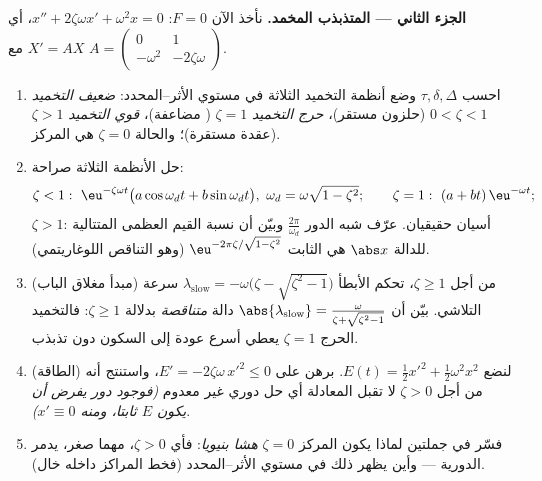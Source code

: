 \begin{problem}
\medskip
\noindent\textbf{الجزء الثاني --- المتذبذب المخمد.} نأخذ الآن
$F =
0$: $x'' + 2\zeta\omega x' + \omega^2x = 0$، أي $X' = AX$ مع $A = \begin{pmatrix} 0 & 1\\ -\omega^2 &
-2\zeta\omega\end{pmatrix}$.
\begin{enumerate}[resume]
  \item احسب $\tau, \delta, \Delta$ وضع أنظمة التخميد الثلاثة في مستوي
        الأثر--المحدد: \emph{ضعيف التخميد} $0 < \zeta < 1$ (حلزون مستقر)،
        \emph{حرج التخميد} $\zeta = 1$ ( مضاعفة)،
        \emph{قوي التخميد} $\zeta > 1$ (عقدة مستقرة)؛ والحالة $\zeta = 0$ هي
        المركز.
  \item حل الأنظمة الثلاثة صراحة:
        \[
        \zeta < 1:\ \eu^{-\zeta\omega t}\bigl(a\cos\omega_d t
        + b\sin\omega_dt\bigr),\ \omega_d =
        \omega\sqrt{1-\zeta^2};
        \qquad
        \zeta = 1:\ (a + bt)\,\eu^{-\omega t};
        \]
        $\zeta > 1$: أسيان حقيقيان. عرّف شبه الدور $\frac{2\pi}{\omega_d}$ وبيّن أن نسبة
        القيم العظمى المتتالية للدالة $\abs x$ هي الثابت $\eu^{-2\pi\zeta/\sqrt{1-\zeta^2}}$ (وهو
        التناقص اللوغاريتمي).
  \item (مبدأ مغلاق الباب) من أجل $\zeta \geq 1$، تحكم 
        الأبطأ $\lambda_{\mathrm{slow}} = -\omega\bigl(\zeta -
        \sqrt{\zeta^2-1}\bigr)$ سرعة التلاشي. بيّن أن $\abs{\lambda_{\mathrm{slow}}} =
        \frac{\omega}{\zeta + \sqrt{\zeta^2 - 1}}$ دالة
        \emph{متناقصة} بدلالة $\zeta \geq 1$: فالتخميد الحرج $\zeta = 1$ يعطي
        أسرع عودة إلى السكون دون تذبذب.
  \item (الطاقة) لنضع $E(t) = \frac12x'^2 +
        \frac12\omega^2x^2$. برهن على $E' = -2\zeta\omega\,x'^2
        \leq 0$، واستنتج أنه من أجل
        $\zeta > 0$ لا تقبل المعادلة أي حل دوري غير معدوم \emph{(فوجود
        دور يفرض أن يكون $E$ ثابتا، ومنه $x' \equiv 0$)}.
  \item فسّر في جملتين لماذا يكون المركز $\zeta = 0$ \emph{هشا بنيويا}:
        فأي $\zeta > 0$، مهما صغر، يدمر الدورية --- وأين يظهر ذلك في
        مستوي الأثر--المحدد (فخط المراكز داخله خال).
\end{enumerate}


\end{problem}
